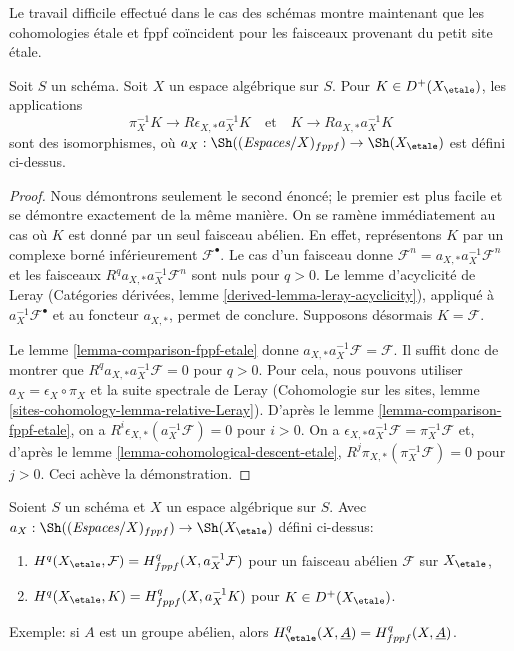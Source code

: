 \noindent
Le travail difficile effectué dans le cas des schémas montre maintenant que
les cohomologies étale et fppf coïncident pour les faisceaux provenant du
petit site étale.

\begin{lemma}
\label{lemma-cohomological-descent-etale-fppf}
Soit $S$ un schéma. Soit $X$ un espace algébrique sur $S$.
Pour $K \in D^+(X_\etale)$, les applications
$$
\pi_X^{-1}K \longrightarrow R\epsilon_{X, *}a_X^{-1}K
\quad\text{et}\quad
K \longrightarrow Ra_{X, *}a_X^{-1}K
$$
sont des isomorphismes, où
$a_X : \Sh((\textit{Espaces}/X)_{fppf}) \to \Sh(X_\etale)$ est défini ci-dessus.
\end{lemma}

\begin{proof}
Nous démontrons seulement le second énoncé; le premier est plus facile et se
démontre exactement de la même manière. On se ramène immédiatement au cas où
$K$ est donné par un seul faisceau abélien. En effet, représentons $K$ par un
complexe borné inférieurement $\mathcal{F}^\bullet$. Le cas d'un faisceau donne
$\mathcal{F}^n = a_{X, *} a_X^{-1} \mathcal{F}^n$
et les faisceaux $R^qa_{X, *}a_X^{-1}\mathcal{F}^n$ sont nuls pour $q > 0$.
Le lemme d'acyclicité de Leray (Catégories dérivées, lemme
\ref{derived-lemma-leray-acyclicity}), appliqué à
$a_X^{-1}\mathcal{F}^\bullet$ et au foncteur $a_{X, *}$, permet de conclure.
Supposons désormais $K = \mathcal{F}$.

\medskip\noindent
Le lemme \ref{lemma-comparison-fppf-etale} donne
$a_{X, *}a_X^{-1}\mathcal{F} = \mathcal{F}$. Il suffit donc de montrer que
$R^qa_{X, *}a_X^{-1}\mathcal{F} = 0$ pour $q > 0$.
Pour cela, nous pouvons utiliser $a_X = \epsilon_X \circ \pi_X$ et la suite
spectrale de Leray (Cohomologie sur les sites, lemme
\ref{sites-cohomology-lemma-relative-Leray}).
D'après le lemme \ref{lemma-comparison-fppf-etale}, on a
$R^i\epsilon_{X, *}(a_X^{-1}\mathcal{F}) = 0$ pour $i > 0$.
On a
$\epsilon_{X, *}a_X^{-1}\mathcal{F} = \pi_X^{-1}\mathcal{F}$
et, d'après le lemme \ref{lemma-cohomological-descent-etale},
$R^j\pi_{X, *}(\pi_X^{-1}\mathcal{F}) = 0$ pour $j > 0$.
Ceci achève la démonstration.
\end{proof}

\begin{lemma}
\label{lemma-compare-cohomology-etale-fppf}
Soient $S$ un schéma et $X$ un espace algébrique sur $S$.
Avec $a_X : \Sh((\textit{Espaces}/X)_{fppf}) \to \Sh(X_\etale)$
défini ci-dessus:
\begin{enumerate}
\item $H^q(X_\etale, \mathcal{F}) = H^q_{fppf}(X, a_X^{-1}\mathcal{F})$
pour un faisceau abélien $\mathcal{F}$ sur $X_\etale$,
\item $H^q(X_\etale, K) = H^q_{fppf}(X, a_X^{-1}K)$ pour $K \in D^+(X_\etale)$.
\end{enumerate}
Exemple: si $A$ est un groupe abélien, alors
$H^q_\etale(X, \underline{A}) = H^q_{fppf}(X, \underline{A})$.
\end{lemma}

